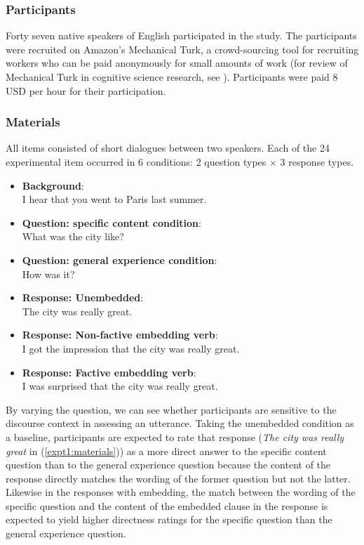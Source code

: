 \documentclass[output=paper]{LSP/langsci}
\begin{document}
\subsubsection*{Participants}


Forty seven native speakers of English participated in the study. The participants were recruited on Amazon's Mechanical Turk, a crowd-sourcing tool for recruiting workers who can be paid anonymously for small amounts of work (for review of Mechanical Turk in cognitive science research, see \cite{munro-etal10}).  Participants were paid 8 USD per hour for their participation.

\subsubsection*{Materials}

All items consisted of short dialogues between two speakers. Each of the 24 experimental item occurred in 6 conditions: 2 question types $\times$ 3 response types.


\begin{exe}
\ex \label{expt1:materials}\begin{itemize}
\item[] \textbf{Background}: \\ 
I hear that you went to Paris last summer.
\item[] \textbf{Question:  specific content condition}:\\ 
What was the city like? 
\item[] \textbf{Question: general experience condition}:  \\ 
How was it?
\item[] \textbf{Response:  Unembedded}: \\
The city was really great.
\item[] \textbf{Response:  Non-factive embedding verb}: \\
I got the impression that the city was really great. 
\item[] \textbf{Response:  Factive embedding verb}: \\
I was surprised that the city was really great.
\end{itemize}
\end{exe}


By varying the question, we can see whether participants are sensitive to the discourse context in assessing an utterance. Taking the unembedded condition as a baseline, participants are expected to rate that response ({\it The city was really great} in (\ref{expt1:materials})) as a more direct answer to the specific content question than to the general experience question because the content of the response directly matches the wording of the former question but not the latter. Likewise in the responses with embedding, the match between the wording of the specific question and the content of the embedded clause in the response is expected to yield higher directness ratings for the specific question than the general experience question.  
\end{document}
